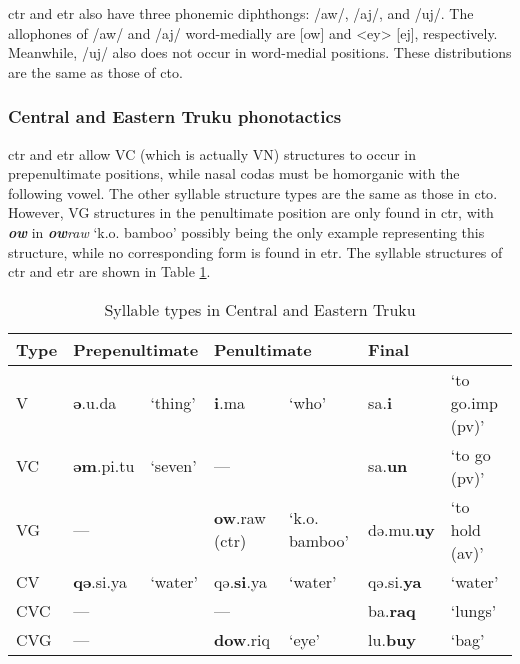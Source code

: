 \acl{ctr} and \acl{etr} also have three phonemic diphthongs: /aw/, /aj/, and /uj/. The allophones of /aw/ and /aj/ word-medially are [ow] and <ey> [ej], respectively. Meanwhile, /uj/ also does not occur in word-medial positions. These distributions are the same as those of \acl{cto}.

\subsubsection{Central and Eastern Truku phonotactics}

\acl{ctr} and \acl{etr} allow VC (which is actually VN) structures to occur in prepenultimate positions, while nasal codas must be homorganic with the following vowel. The other syllable structure types are the same as those in \acl{cto}. However, VG structures in the penultimate position are only found in \acl{ctr}, with \textbf{\textit{ow}} in \textit{\textbf{ow}raw} `k.o. bamboo' possibly being the only example representing this structure, while no corresponding form is found in \acl{etr}. The syllable structures of \acl{ctr} and \acl{etr} are shown in Table \ref{tab:sy_ty_tr}.

\begin{table}[!htbp]
\centering
\caption{Syllable types in Central and Eastern Truku}
\label{tab:sy_ty_tr}
\begin{tabular}{lllllll}
\hline
Type & \multicolumn{2}{l}{Prepenultimate} & \multicolumn{2}{l}{Penultimate} & \multicolumn{2}{l}{Final}                \\ \hline
V             & \textbf{ə}.u.da   & `thing'         & \textbf{i}.ma              & `who'         & sa.\textbf{i}        & `to go.\acs{imp} (\acs{pv})' \\
VC            & \textbf{əm}.pi.tu & `seven'        & ---                         &               & sa.\textbf{un}       & `to go (\acs{pv})'           \\
VG            & ---              &                 & \textbf{ow}.raw (\acs{ctr})   & `k.o. bamboo' & də.mu.\textbf{uy} &  `to hold (\acs{av})'        \\
CV            & \textbf{qə}.si.ya  & `water'       & qə.\textbf{si}.ya          & `water'       & qə.si.\textbf{ya}    & `water'                    \\
CVC           & ---              &                 & ---                        &               & ba.\textbf{raq}      & `lungs'                    \\
CVG           & ---              &                 & \textbf{dow}.riq           & `eye'    & lu.\textbf{buy}      & `bag'                     \\ \hline
\end{tabular}
\end{table}

